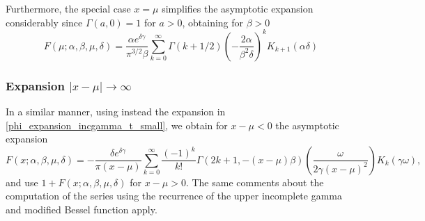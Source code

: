 \documentclass[10pt,a4paper,oneside]{article}
\numberwithin{equation}{section}
\begin{document}
Furthermore, the special case $x=\mu$ simplifies the asymptotic expansion considerably since $\Gamma(a, 0) = 1$ for $a > 0$, obtaining for $\beta > 0$
\begin{equation}\label{expansion_x_eq_mu_large_delta}
F(\mu; \alpha, \beta, \mu, \delta) = \frac{\alpha e^{\delta \gamma}}{\pi^{3/2} \beta}\sum_{k=0}^{\infty}\Gamma(k + 1/2)\left(-\frac{2\alpha}{\beta^2 \delta}\right)^k K_{k+1}(\alpha \delta)
\end{equation}

\subsubsection{Expansion $|x-\mu| \to \infty$}

In a similar manner, using instead the expansion in \eqref{phi_expansion_incgamma_t_small}, we obtain for $x-\mu < 0$ the asymptotic expansion
\begin{equation}\label{general_asymptotic_xmu}
F(x; \alpha, \beta, \mu, \delta) = -\frac{\delta e^{\delta\gamma}}{\pi (x-\mu)}\sum_{k=0}^{\infty}\frac{(-1)^k}{k!}\Gamma(2k + 1, -(x-\mu)\beta) \left(\frac{\omega}{2\gamma (x-\mu)^2}\right) K_k(\gamma \omega),
\end{equation}
and use $1 + F(x; \alpha, \beta, \mu, \delta)$ for $x-\mu > 0$. The same comments about the computation of the series using the recurrence of the upper incomplete gamma and modified Bessel function apply.
\end{document}
